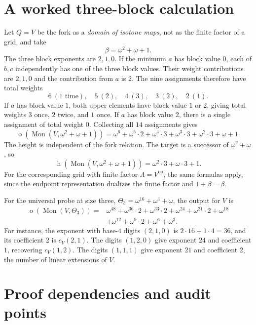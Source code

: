 \documentclass[11pt,a4paper]{article}
\theoremstyle{definition}
\theoremstyle{remark}
\newcommand{\Mon}{\operatorname{Mon}}
\newcommand{\otype}{\operatorname{o}}
\newcommand{\height}{\operatorname{h}}
\newcommand{\op}{\mathrm{op}}
\begin{document}
\section{A worked three-block calculation}\label{app:worked}
Let $Q=V$ be the fork as a \emph{domain of isotone maps}, not as the finite
factor of a grid, and take
\[
 \beta=\omega^2+\omega+1.
\]
The three block exponents are $2,1,0$. If the minimum $a$ has block value
$0$, each of $b,c$ independently has one of the three block values. Their
weight contributions are $2,1,0$ and the contribution from $a$ is $2$.
The nine assignments therefore have total weights
\[
 6\ (1\text{ time}),\quad
 5\ (2),\quad 4\ (3),\quad 3\ (2),\quad 2\ (1).
\]
If $a$ has block value $1$, both upper elements have block value $1$ or
$2$, giving total weights $3$ once, $2$ twice, and $1$ once. If $a$ has
block value $2$, there is a single assignment of total weight $0$.
Collecting all $14$ assignments gives
\begin{equation}\label{eq:workedV}
 \otype(\Mon(V,\omega^2+\omega+1))
 =\omega^6+\omega^5\cdot2+\omega^4\cdot3+
   \omega^3\cdot3+\omega^2\cdot3+\omega+1.
\end{equation}
The height is independent of the fork relation. The target is a successor
of $\omega^2+\omega$, so
\[
 \height(\Mon(V,\omega^2+\omega+1))
 =\omega^2\cdot3+\omega\cdot3+1.
\]
For the corresponding grid with finite factor $\Lambda=V^{\op}$, the
same formulas apply, since the endpoint representation dualizes the finite
factor and $1+\beta=\beta$.

For the universal probe at size three,
$\Theta_3=\omega^{16}+\omega^4+\omega$, the output for $V$ is
\begin{align*}
 \otype(\Mon(V,\Theta_3))={}&
 \omega^{48}+\omega^{36}\cdot2+\omega^{33}\cdot2+
 \omega^{24}+\omega^{21}\cdot2+\omega^{18}\\
 &+\omega^{12}+\omega^9\cdot2+\omega^6+\omega^3.
\end{align*}
For instance, the exponent with base-$4$ digits $(2,1,0)$ is
$2\cdot16+1\cdot4=36$, and its coefficient $2$ is $c_V(2,1)$.
The digits $(1,2,0)$ give exponent $24$ and coefficient $1$, recovering
$c_V(1,2)$. The digits $(1,1,1)$ give exponent $21$ and coefficient $2$,
the number of linear extensions of $V$.

\section{Proof dependencies and audit points}
\end{document}
